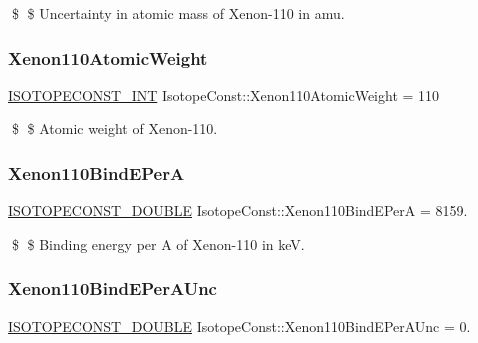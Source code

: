 \$ \$ Uncertainty in atomic mass of Xenon-\/110 in amu. \mbox{\label{group___isotope_const-_xenon-_xe110_ga46f97c465952c3c54fa7c26342f72884}} 
\subsubsection{\texorpdfstring{Xenon110\+Atomic\+Weight}{Xenon110AtomicWeight}}
{\footnotesize\ttfamily \mbox{\hyperlink{group___isotope_const-_macros_ga5f18360b3e99483a35c32d789e62621c}{I\+S\+O\+T\+O\+P\+E\+C\+O\+N\+S\+T\+\_\+\+I\+NT}} Isotope\+Const\+::\+Xenon110\+Atomic\+Weight = 110}

\$ \$ Atomic weight of Xenon-\/110. \mbox{\label{group___isotope_const-_xenon-_xe110_ga7b5ff3cb1db6e2f24dbf1812ce1a6801}} 
\subsubsection{\texorpdfstring{Xenon110\+Bind\+E\+PerA}{Xenon110BindEPerA}}
{\footnotesize\ttfamily \mbox{\hyperlink{group___isotope_const-_macros_ga8f45a7272ce02c0b4c65c44636ed719a}{I\+S\+O\+T\+O\+P\+E\+C\+O\+N\+S\+T\+\_\+\+D\+O\+U\+B\+LE}} Isotope\+Const\+::\+Xenon110\+Bind\+E\+PerA = 8159.}

\$ \$ Binding energy per A of Xenon-\/110 in keV. \mbox{\label{group___isotope_const-_xenon-_xe110_ga6da6ac4b7350a8da2189f91346c5b0a9}} 
\subsubsection{\texorpdfstring{Xenon110\+Bind\+E\+Per\+A\+Unc}{Xenon110BindEPerAUnc}}
{\footnotesize\ttfamily \mbox{\hyperlink{group___isotope_const-_macros_ga8f45a7272ce02c0b4c65c44636ed719a}{I\+S\+O\+T\+O\+P\+E\+C\+O\+N\+S\+T\+\_\+\+D\+O\+U\+B\+LE}} Isotope\+Const\+::\+Xenon110\+Bind\+E\+Per\+A\+Unc = 0.}

